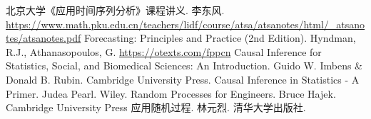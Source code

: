 \begin{thebibliography}{99}
    北京大学《应用时间序列分析》课程讲义. 李东风. \url{https://www.math.pku.edu.cn/teachers/lidf/course/atsa/atsanotes/html/_atsanotes/atsanotes.pdf}
    Forecasting: Principles and Practice (2nd Edition). Hyndman, R.J., Athanasopoulos, G. \url{https://otexts.com/fppcn}
    Causal Inference for Statistics, Social, and Biomedical Sciences: An Introduction. Guido W. Imbens \& Donald B. Rubin. Cambridge University Press.
    Causal Inference in Statistics - A Primer. Judea Pearl. Wiley.
    Random Processes for Engineers. Bruce Hajek. Cambridge University Press
    应用随机过程. 林元烈. 清华大学出版社.


\end{thebibliography}